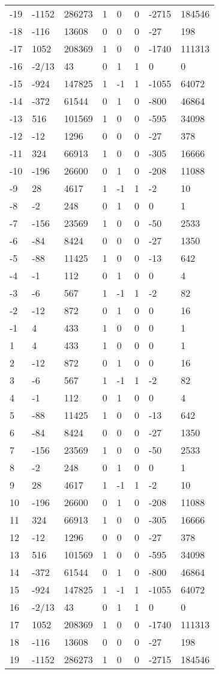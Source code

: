 \documentclass{amsart}
\begin{document}
\begin{longtable}{|l|l|l|lllll|}
-19&-1152&286273&1&0&0&-2715&184546\\
-18&-116&13608&0&0&0&-27&198\\
-17&1052&208369&1&0&0&-1740&111313\\
-16&-2/13&43&0&1&1&0&0\\
-15&-924&147825&1&-1&1&-1055&64072\\
-14&-372&61544&0&1&0&-800&46864\\
-13&516&101569&1&0&0&-595&34098\\
-12&-12&1296&0&0&0&-27&378\\
-11&324&66913&1&0&0&-305&16666\\
-10&-196&26600&0&1&0&-208&11088\\
-9&28&4617&1&-1&1&-2&10\\
-8&-2&248&0&1&0&0&1\\
-7&-156&23569&1&0&0&-50&2533\\
-6&-84&8424&0&0&0&-27&1350\\
-5&-88&11425&1&0&0&-13&642\\
-4&-1&112&0&1&0&0&4\\
-3&-6&567&1&-1&1&-2&82\\
-2&-12&872&0&1&0&0&16\\
-1&4&433&1&0&0&0&1\\
1&4&433&1&0&0&0&1\\
2&-12&872&0&1&0&0&16\\
3&-6&567&1&-1&1&-2&82\\
4&-1&112&0&1&0&0&4\\
5&-88&11425&1&0&0&-13&642\\
6&-84&8424&0&0&0&-27&1350\\
7&-156&23569&1&0&0&-50&2533\\
8&-2&248&0&1&0&0&1\\
9&28&4617&1&-1&1&-2&10\\
10&-196&26600&0&1&0&-208&11088\\
11&324&66913&1&0&0&-305&16666\\
12&-12&1296&0&0&0&-27&378\\
13&516&101569&1&0&0&-595&34098\\
14&-372&61544&0&1&0&-800&46864\\
15&-924&147825&1&-1&1&-1055&64072\\
16&-2/13&43&0&1&1&0&0\\
17&1052&208369&1&0&0&-1740&111313\\
18&-116&13608&0&0&0&-27&198\\
19&-1152&286273&1&0&0&-2715&184546\\

\end{longtable}
\end{document}
